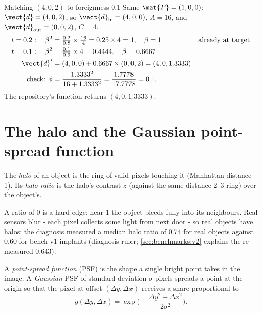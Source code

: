 \begin{worked}[label={we:benchmarks:match}]{Matching $(4, 0, 2)$ to foreignness 0.1}
Same $\mat{P} = (1, 0, 0)$; $\vect{d} = (4, 0, 2)$, so $\vect{d}_{\text{in}} = (4, 0, 0)$, $A = 16$, and
$\vect{d}_{\text{out}} = (0, 0, 2)$, $C = 4$.
\begin{align*}
t = 0.2: \quad \beta^2 &= \tfrac{0.2}{0.8} \times \tfrac{16}{4} = 0.25 \times 4 = 1, \quad \beta = 1 && \text{already at target}\\
t = 0.1: \quad \beta^2 &= \tfrac{0.1}{0.9} \times 4 = 0.4444, \quad \beta = 0.6667\\
\vect{d}' &= (4, 0, 0) + 0.6667 \times (0, 0, 2) = (4, 0, 1.3333)\\
\text{check: } \phi &= \frac{1.3333^2}{16 + 1.3333^2} = \frac{1.7778}{17.7778} = 0.1.
\end{align*}
The repository's function returns $(4, 0, 1.3333)$\tagC{}.
\end{worked}

\section{The halo and the Gaussian point-spread function}\label{sec:benchmarks:psf}

\begin{definition}
The \emph{halo} of an object is the ring of valid pixels touching it (Manhattan distance 1). Its
\emph{halo ratio} is the halo's contrast $z$ (against the same distance-2--3 ring) over the object's.
\end{definition}

A ratio of 0 is a hard edge; near 1 the object bleeds fully into its neighbours. Real sensors blur - each pixel collects
some light from next door - so real objects have halos: the diagnosis measured a median halo ratio of 0.74 for real
objects against 0.60 for bench-v1 implants (diagnosis ruler; \cref{sec:benchmarks:v2} explains the re-measured
0.643).

\begin{definition}
A \emph{point-spread function} (PSF) is the shape a single bright point takes in the
image. A \emph{Gaussian} PSF of standard deviation $\sigma$ pixels spreads a point at the origin so that the pixel at
offset $(\Delta y, \Delta x)$ receives a share proportional to
\begin{equation}\label{eq:benchmarks:gauss}
g(\Delta y, \Delta x) = \exp\!\Big(-\frac{\Delta y^2 + \Delta x^2}{2\sigma^2}\Big).
\end{equation}
\end{definition}

